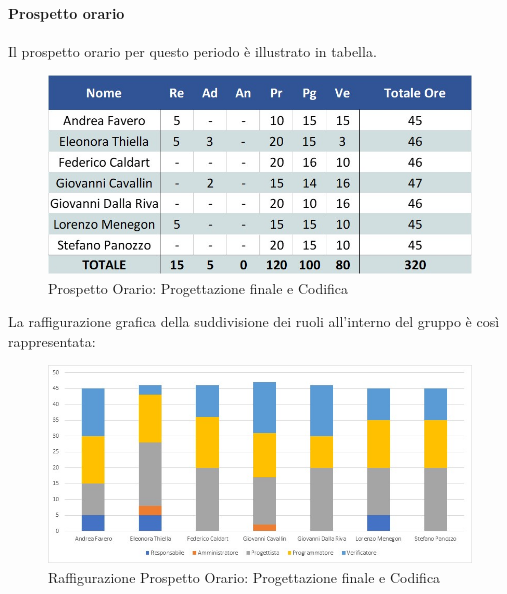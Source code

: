 \paragraph{Prospetto orario}
Il prospetto orario per questo periodo è illustrato in tabella.
\begin{figure}[H]
	\centerline{\includegraphics[scale=0.7]{img/Preventivo/ProgettazioneFinaleCodificaOrario.jpg}}
	\caption{Prospetto Orario: Progettazione finale e Codifica}
	\clearpage
\end{figure}
La raffigurazione grafica della suddivisione dei ruoli all'interno del gruppo è così rappresentata: 
\begin{figure}[H]
	\centerline{\includegraphics[scale=0.85]{img/Preventivo/Istogrammi/ProgettazioneFinaleCodifica.jpg}}
	\caption{Raffigurazione Prospetto Orario: Progettazione finale e Codifica}
	\clearpage
\end{figure}
\newpage
